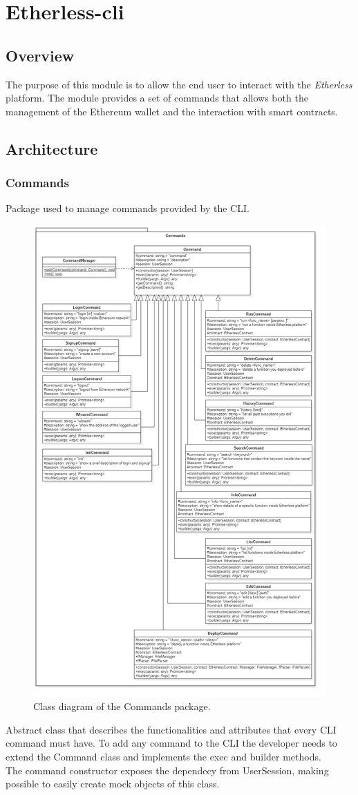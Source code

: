 \section{Etherless-cli}	

	\subsection{Overview}
	The purpose of this module is to allow the end user to interact with the \textit{Etherless} platform. The module provides a set of commands that allows both the management of the Ethereum wallet and the interaction with smart contracts.
	
	\subsection{Architecture}
		\subsubsection{Commands}
		Package used to manage commands provided by the CLI.
		\begin{figure} [H]
			\centering
			\includegraphics[width=0.6\linewidth]{diagrammi/etherless-cli/Commands}
			\caption{Class diagram of the Commands package.}
		\end{figure}
	
			Abstract class that describes the functionalities and attributes that every CLI command must have. To add any command to the CLI the developer needs to extend the Command class and implements the exec and builder methods. \\ 
			The command constructor exposes the dependecy from UserSession, making possible to  easily create mock objects of this class. 
			
